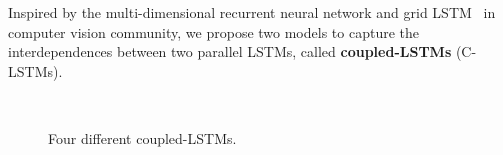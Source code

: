 \documentclass{article}
\begin{document}
Inspired by the multi-dimensional recurrent neural network \cite{graves2007multi,graves2009offline,byeon2015scene} and grid LSTM~\cite{kalchbrenner2015grid} in computer vision community, we propose two models to capture the interdependences between two parallel LSTMs, called \textbf{coupled-LSTMs} (C-LSTMs).
\begin{figure}[t]\centering
{}\hspace{0.2cm}
  \\
  \hspace{0.2cm}
  \caption{Four different coupled-LSTMs.}\label{fig:arc}
\end{figure}
\end{document}
